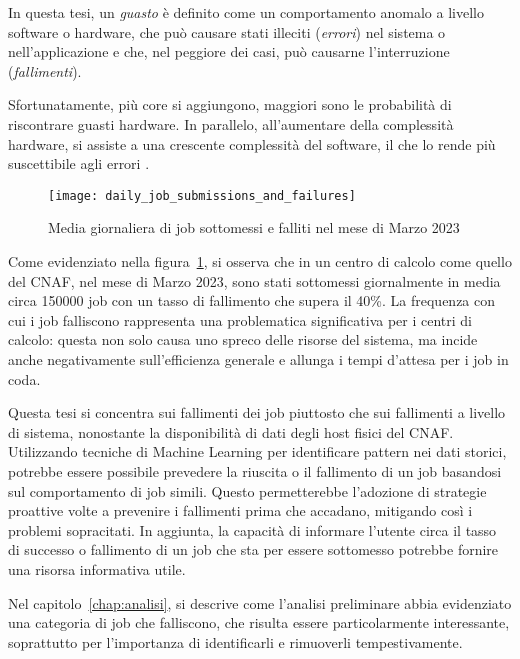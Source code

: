 In questa tesi, un \textit{guasto} è definito come un comportamento anomalo a
livello software o hardware, che può causare stati illeciti (\textit{errori})
nel sistema o nell'applicazione e che, nel peggiore dei casi, può causarne
l'interruzione (\textit{fallimenti}).

Sfortunatamente, più core si aggiungono, maggiori sono le probabilità di
riscontrare guasti hardware. In parallelo, all'aumentare della complessità
hardware, si assiste a una crescente complessità del software, il che lo rende
più suscettibile agli errori \cite{Cappello2014}.

\begin{figure}[!ht]
    \begin{center}
        \texttt{[image: daily\_job\_submissions\_and\_failures]}
    \end{center}
    \caption{Media giornaliera di job sottomessi e falliti nel mese di Marzo
    2023}\label{fig:daily_job_submissions_and_failures}
\end{figure}

Come evidenziato nella figura~\ref{fig:daily_job_submissions_and_failures}, si
osserva che in un centro di calcolo come quello del CNAF, nel mese di Marzo
2023, sono stati sottomessi giornalmente in media circa 150000 job con un
tasso di fallimento che supera il 40\%. 
La frequenza con cui i job falliscono rappresenta una problematica
significativa per i centri di calcolo: questa non solo causa uno spreco delle
risorse del sistema, ma incide anche negativamente sull'efficienza generale e
allunga i tempi d'attesa per i job in coda.

Questa tesi si concentra sui fallimenti dei job piuttosto che sui fallimenti a
livello di sistema, nonostante la disponibilità di dati degli host fisici del
CNAF. Utilizzando tecniche di Machine Learning per identificare pattern nei
dati storici, potrebbe essere possibile prevedere la riuscita o il fallimento
di un job basandosi sul comportamento di job simili. Questo permetterebbe
l'adozione di strategie proattive volte a prevenire i fallimenti prima che
accadano, mitigando così i problemi sopracitati. In aggiunta, la capacità di
informare l'utente circa il tasso di successo o fallimento di un job che sta
per essere sottomesso potrebbe fornire una risorsa informativa utile.

\mbox{}

Nel capitolo~\ref{chap:analisi}, si descrive come l'analisi preliminare abbia
evidenziato una categoria di job che falliscono, che risulta essere
particolarmente interessante, soprattutto per l'importanza di identificarli e
rimuoverli tempestivamente.

